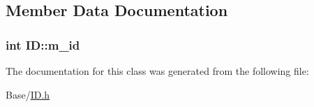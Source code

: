 \subsection{Member Data Documentation}
\hypertarget{class_i_d_ab5a717e6e0b00b07695a97b793ea0e44}{
\subsubsection[{m\-\_\-id}]{\setlength{\rightskip}{0pt plus 5cm}int I\-D\-::m\-\_\-id\hspace{0.3cm}{\ttfamily [private]}}}\label{class_i_d_ab5a717e6e0b00b07695a97b793ea0e44}


The documentation for this class was generated from the following file\-:\begin{DoxyCompactItemize}
\item 
Base/\hyperlink{_i_d_8h}{I\-D.\-h}\end{DoxyCompactItemize}
